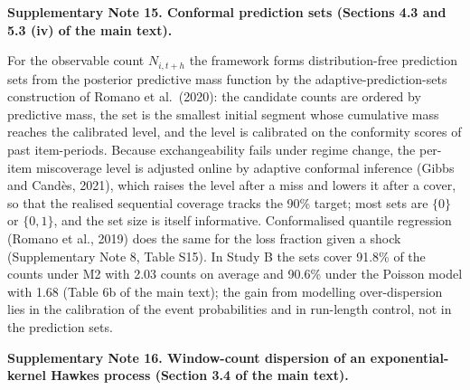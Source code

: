 

\textbf{Supplementary Note 15. Conformal prediction sets (Sections 4.3 and 5.3 (iv) of the main text).}

For the observable count $N_{i,t+h}$ the framework forms distribution-free prediction sets from the posterior predictive mass function by the adaptive-prediction-sets construction of Romano et al.\ (2020): the candidate counts are ordered by predictive mass, the set is the smallest initial segment whose cumulative mass reaches the calibrated level, and the level is calibrated on the conformity scores of past item-periods. Because exchangeability fails under regime change, the per-item miscoverage level is adjusted online by adaptive conformal inference (Gibbs and Candès, 2021), which raises the level after a miss and lowers it after a cover, so that the realised sequential coverage tracks the 90\% target; most sets are $\{0\}$ or $\{0,1\}$, and the set size is itself informative. Conformalised quantile regression (Romano et al., 2019) does the same for the loss fraction given a shock (Supplementary Note 8, Table S15). In Study B the sets cover 91.8\% of the counts under M2 with 2.03 counts on average and 90.6\% under the Poisson model with 1.68 (Table 6b of the main text); the gain from modelling over-dispersion lies in the calibration of the event probabilities and in run-length control, not in the prediction sets.

\textbf{Supplementary Note 16. Window-count dispersion of an exponential-kernel Hawkes process (Section 3.4 of the main text).}

